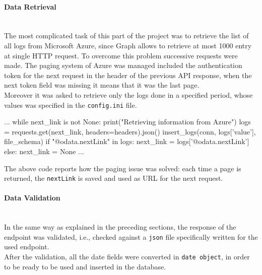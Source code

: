 \documentclass[12pt, a4paper, oneside]{article}
\begin{document}
\paragraph{Data Retrieval} ~\\
The most complicated task of this part of the project was to retrieve the list of all logs from Microsoft Azure, since Graph allows to retrieve at most 1000 entry at single HTTP request. To overcome this problem
successive requests were made. The paging system of Azure was managed included the authentication token for the next request in the header of the previous API response, when the next token field was missing it means
that it was the last page.\\
Moreover it was asked to retrieve only the logs done in a specified period, whose values was specified in the \texttt{config.ini} file.
\begin{python}
    ...
    while next_link is not None:
        print("Retrieving information from Azure")
        logs = requests.get(next_link, headers=headers).json()
        insert_logs(conn, logs['value'], file_schema)
        if "@odata.nextLink" in logs:
            next_link = logs['@odata.nextLink']
        else:
            next_link = None
    ...
\end{python}
The above code reports how the paging issue was solved: each time a page is returned, the \texttt{nextLink} is saved and used as URL for the next request.

\paragraph{Data Validation} ~\\
In the same way as explained in the preceding sections, the response of the endpoint was validated, i.e., checked against a \texttt{json} file specifically written for the used endpoint.\\
After the validation, all the date fields were converted in \texttt{date object}, in order to be ready to be used and inserted in the database.
\end{document}
